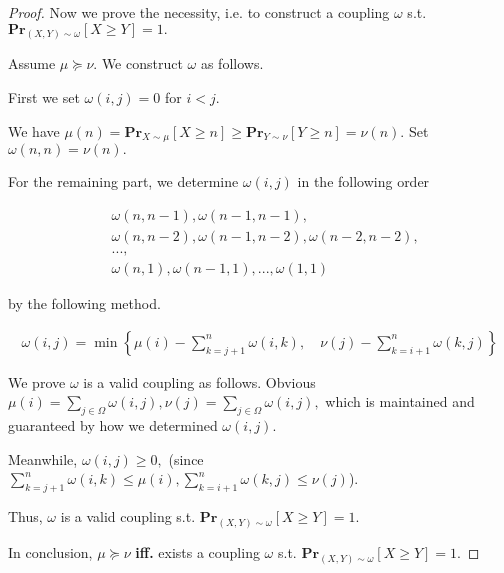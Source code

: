 \documentclass{article}
\begin{document}
\begin{proof}
    
    \vspace{3em} \hspace{1.3em}
    Now we prove the necessity, i.e. to construct a coupling $\omega$ s.t. $\mathbf{Pr}_{(X,Y)\sim\omega}\left[X\geq Y\right]=1.$
    
    \hspace{1.3em}
    Assume $\mu\succeq\nu$. We construct $\omega$ as follows. 
    
    \hspace{1.3em}
    First we set $\omega(i,j)=0$ for $i<j.$
    
    \hspace{1.3em}
    We have $\mu(n)=\mathbf{Pr}_{X\sim\mu}\left[X\geq n\right]\geq\mathbf{Pr}_{Y\sim\nu}\left[Y\geq n\right]=\nu(n).$ Set $\omega(n,n)=\nu(n).$
    
    \hspace{1.3em}
    For the remaining part, we determine $\omega(i,j)$ in the following order
    
    \vspace{-3em}
    \begin{align*}
        &\omega(n,n-1),\omega(n-1,n-1),\\
        &\omega(n,n-2),\omega(n-1,n-2),\omega(n-2,n-2),
        \\
        &...,\\
        &\omega(n,1),\omega(n-1,1),...,\omega(1,1)
    \end{align*}
    
    \vspace{-1em} \hspace{1.3em}
    by the following method.
    
    \vspace{-2.5em}
    \begin{align*}
        \omega(i,j) = \min\left\{\mu(i)-\sum_{k=j+1}^n\omega(i,k),\quad \nu(j)-\sum_{k=i+1}^n\omega(k,j)\right\}
    \end{align*}
    
    \vspace{-0.5em} \hspace{1.3em}
    We prove $\omega$ is a valid coupling as follows. Obvious $\mu(i)=\sum_{j\in\Omega}\omega(i,j),\nu(j)=\sum_{j\in\Omega}\omega(i,j),$ which is maintained and guaranteed by how we determined $\omega(i,j)$.
    
    \hspace{1.3em}
    Meanwhile, $\omega(i,j)\geq0,$ (since $\sum_{k=j+1}^n\omega(i,k)\le\mu(i),\sum_{k=i+1}^n\omega(k,j)\le\nu(j)$).
    
    \hspace{1.3em}
    Thus, $\omega$ is a valid coupling s.t. $\mathbf{Pr}_{(X,Y)\sim\omega}\left[X\geq Y\right]=1.$
    
    \vspace{2em} \hspace{1.3em}
    In conclusion, $\mu\succeq\nu$ \textbf{iff.} exists a coupling $\omega$ s.t. $\mathbf{Pr}_{(X,Y)\sim\omega}\left[X\geq Y\right]=1.$
\end{proof}
\end{document}
